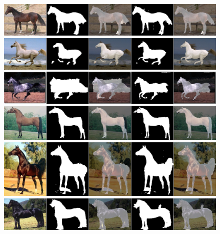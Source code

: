 \documentclass[10pt,journal,letterpaper,compsoc]{IEEEtran}
\begin{document}
\begin{figure}[t]
  \begin{center}
    \setlength{\tabcolsep}{0pt}
    \includegraphics[width=\linewidth]{figures/weizmann/horse165} \\
    \vspace{1mm}
    \includegraphics[width=\linewidth]{figures/weizmann/horse232} \\
    \vspace{1mm}
    \includegraphics[width=\linewidth]{figures/weizmann/horse239} \\
    \vspace{1mm}
    \includegraphics[width=\linewidth]{figures/weizmann/horse250} \\
    \vspace{1mm}
    \includegraphics[width=\linewidth]{figures/weizmann/horse268} \\
    \vspace{1mm}
    \includegraphics[width=\linewidth]{figures/weizmann/horse276} \\

\end{center}
\end{figure}
\end{document}
